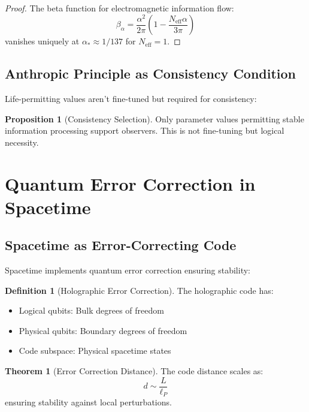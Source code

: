 \documentclass[11pt,a4paper]{article}
\theoremstyle{definition}
\newtheorem{definition}{Definition}[section]
\newtheorem{theorem}{Theorem}[section]
\newtheorem{proposition}{Proposition}[section]
\begin{document}
\begin{proof}
The beta function for electromagnetic information flow:
\[\beta_\alpha = \frac{\alpha^2}{2\pi}\left(1 - \frac{N_{\text{eff}}\alpha}{3\pi}\right)\]
vanishes uniquely at $\alpha_* \approx 1/137$ for $N_{\text{eff}} = 1$.
\end{proof}

\subsection{Anthropic Principle as Consistency Condition}

Life-permitting values aren't fine-tuned but required for consistency:

\begin{proposition}[Consistency Selection]
Only parameter values permitting stable information processing support observers. This is not fine-tuning but logical necessity.
\end{proposition}

\section{Quantum Error Correction in Spacetime}

\subsection{Spacetime as Error-Correcting Code}

Spacetime implements quantum error correction ensuring stability:

\begin{definition}[Holographic Error Correction]
The holographic code has:
\begin{itemize}
\item Logical qubits: Bulk degrees of freedom
\item Physical qubits: Boundary degrees of freedom
\item Code subspace: Physical spacetime states
\end{itemize}
\end{definition}

\begin{theorem}[Error Correction Distance]
The code distance scales as:
\begin{equation}
d \sim \frac{L}{\ell_P}
\end{equation}
ensuring stability against local perturbations.
\end{theorem}
\end{document}
